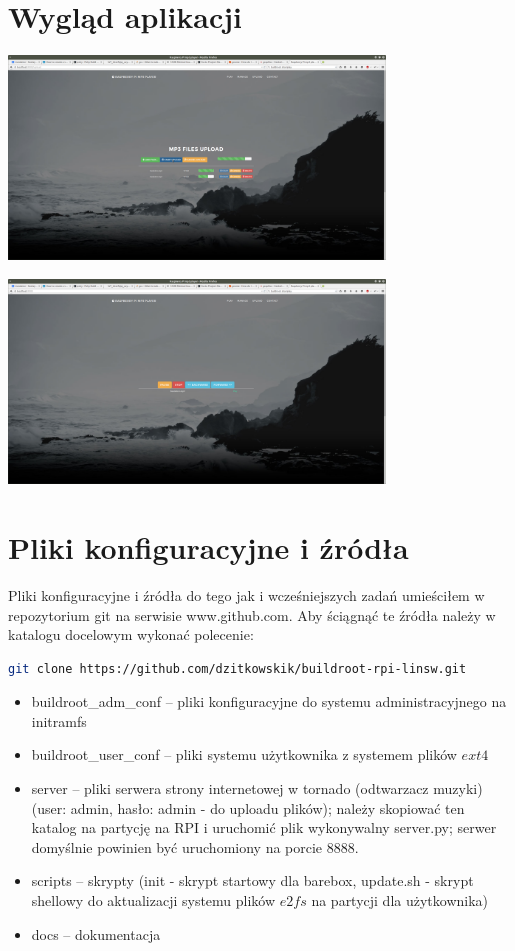 \section{Wygląd aplikacji}
\begin{center}
\includegraphics[width=0.75\textwidth]{Upload.png}
\end{center}
\begin{center}
\includegraphics[width=0.75\textwidth]{Play.png}
\end{center}

\section{Pliki konfiguracyjne i źródła}
Pliki konfiguracyjne i źródła do tego jak i wcześniejszych zadań umieściłem w repozytorium
git na serwisie www.github.com. Aby ściągnąć te źródła należy w katalogu docelowym wykonać polecenie:
\begin{lstlisting}[language=bash]
git clone https://github.com/dzitkowskik/buildroot-rpi-linsw.git
\end{lstlisting}	
\begin{itemize}
\item buildroot\_adm\_conf -- pliki konfiguracyjne do systemu administracyjnego na initramfs
\item buildroot\_user\_conf -- pliki systemu użytkownika z systemem plików $ext4$
\item server -- pliki serwera strony internetowej w tornado (odtwarzacz muzyki) (user: admin, hasło: admin - do uploadu plików); należy skopiować ten katalog na partycję na RPI i uruchomić plik wykonywalny server.py; serwer
domyślnie powinien być uruchomiony na porcie 8888.
\item scripts -- skrypty (init - skrypt startowy dla barebox, update.sh - skrypt shellowy do aktualizacji systemu plików $e2fs$ na partycji dla użytkownika)
\item docs -- dokumentacja
\end{itemize}


